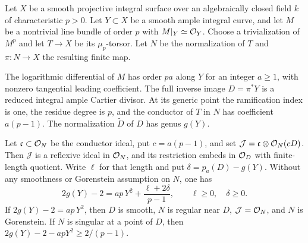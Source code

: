 \begin{proposition}\label{prop:normalized-mup-conductor}
Let $X$ be a smooth projective integral surface over an algebraically
closed field $k$ of characteristic $p>0$. Let $Y\subset X$ be a smooth
ample integral curve, and let $M$ be a nontrivial line bundle of order
$p$ with $M|_Y\simeq\mathcal O_Y$. Choose a trivialization of $M^p$ and let
$T\to X$ be its $\mu_p$-torsor. Let $N$ be the normalization of $T$ and
$\pi:N\to X$ the resulting finite map.

The logarithmic differential of $M$ has order $pa$ along $Y$ for an
integer $a\geq1$, with nonzero tangential leading coefficient. The full
inverse image $D=\pi^*Y$ is a reduced integral ample Cartier divisor.
At its generic point the ramification index is one, the residue degree
is $p$, and the conductor of $T$ in $N$ has coefficient $a(p-1)$.
The normalization $\widetilde D$ of $D$ has genus $g(Y)$.

Let $\mathfrak c\subset\mathcal O_N$ be the conductor ideal, put $c=a(p-1)$,
and set $\mathcal J=\mathfrak c\otimes\mathcal O_N(cD)$.
Then $\mathcal J$ is a reflexive ideal in $\mathcal O_N$, and its restriction
embeds in $\mathcal O_D$ with finite-length quotient. Write $\ell$ for that
length and put $\delta=p_a(D)-g(Y)$. Without any smoothness or
Gorenstein assumption on $N$, one has
\[
 2g(Y)-2=ap\,Y^2+\frac{\ell+2\delta}{p-1},
 \qquad \ell\geq0,\quad\delta\geq0.
\]
If $2g(Y)-2=ap\,Y^2$, then $D$ is smooth, $N$ is regular near $D$,
$\mathcal J=\mathcal O_N$, and $N$ is Gorenstein. If $N$ is singular at a
point of $D$, then $2g(Y)-2-apY^2\geq2/(p-1)$.
\end{proposition}
